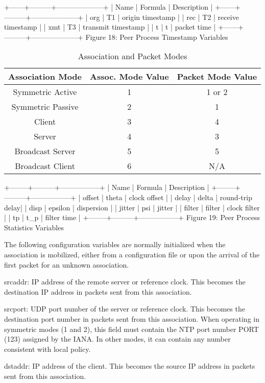+------+---------+--------------------+
| Name | Formula | Description |
+------+---------+--------------------+
| org | T1 | origin timestamp |
| rec | T2 | receive timestamp |
| xmt | T3 | transmit timestamp |
| t | t | packet time |
+------+---------+--------------------+
Figure 18: Peer Process Timestamp Variables

\begin{table}[htb]
\center
\begin{tabular}{c | c | c}
Association Mode & Assoc. Mode Value & Packet Mode Value \\
\hline
\hline
Symmetric Active & 1 & 1 or 2 \\
Symmetric Passive & 2 & 1 \\
Client & 3 & 4 \\
Server & 4 & 3 \\
Broadcast Server & 5 & 5 \\
Broadcast Client & 6 & N/A \\
\hline
\end{tabular}
\label{association_and_packet_modes}
\caption{Association and Packet Modes}
\end{table}

+--------+---------+-----------------+
| Name | Formula | Description |
+--------+---------+-----------------+
| offset | theta | clock offset |
| delay | delta | round-trip delay|
| disp | epsilon | dispersion |
| jitter | psi | jitter |
| filter | filter | clock filter |
| tp | t\_p | filter time |
+--------+---------+-----------------+
Figure 19: Peer Process Statistics Variables

The following configuration variables are normally initialized when
the association is mobilized, either from a configuration file or
upon the arrival of the first packet for an unknown association.

srcaddr: IP address of the remote server or reference clock. This
becomes the destination IP address in packets sent from this
association.

srcport: UDP port number of the server or reference clock. This
becomes the destination port number in packets sent from this
association. When operating in symmetric modes (1 and 2), this field
must contain the NTP port number PORT (123) assigned by the IANA. In
other modes, it can contain any number consistent with local policy.

dstaddr: IP address of the client. This becomes the source IP
address in packets sent from this association.


